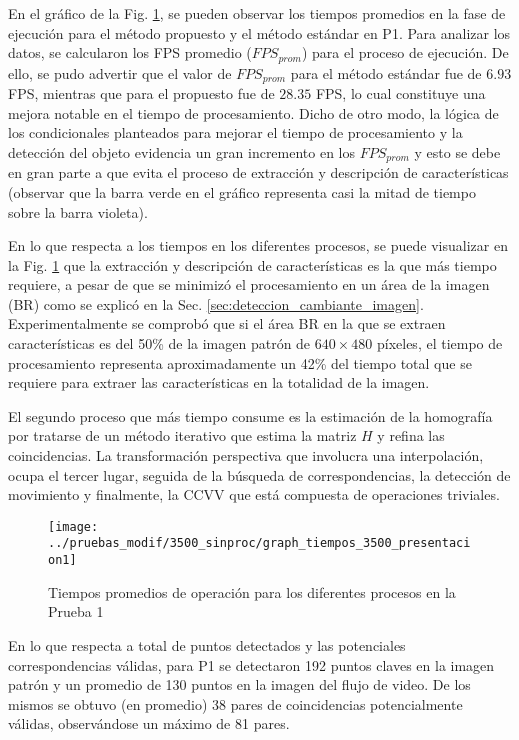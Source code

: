 En el gráfico de la Fig. \ref{graph:graph_tiempos_3500}, se pueden observar los tiempos promedios en la fase de ejecución para el método propuesto y el método estándar en P1. %
Para analizar los datos, se calcularon los FPS promedio ($FPS_{prom}$) para el proceso de ejecución. De ello, se pudo advertir que el valor de $FPS_{prom}$ para el método estándar fue de $6.93$ FPS, mientras que para el propuesto fue de $28.35$ FPS, lo cual constituye una mejora notable en el tiempo de procesamiento. Dicho de otro modo, la lógica de los condicionales planteados para mejorar el tiempo de procesamiento y la detección del objeto evidencia un gran incremento en los $FPS_{prom}$ y esto se debe en gran parte a que evita el proceso de extracción y descripción de características (observar que la barra verde en el gráfico representa casi la mitad de tiempo sobre la barra violeta).

En lo que respecta a los tiempos en los diferentes procesos, se puede visualizar en la Fig. \ref{graph:graph_tiempos_3500} que la extracción y descripción de características es la que más tiempo requiere, a pesar de que se minimizó el procesamiento en un área de la imagen (BR) como se explicó en la Sec. \ref{sec:deteccion_cambiante_imagen}. Experimentalmente se comprobó que si el área BR en la que se extraen características es del 50\% de la imagen patrón de $640 \times 480$ píxeles, el tiempo de procesamiento representa aproximadamente un 42\% del tiempo total que se requiere para extraer las características en la totalidad de la imagen.

El segundo proceso que más tiempo consume es la estimación de la homografía por tratarse de un método iterativo que estima la matriz $H$ y refina las coincidencias. La transformación perspectiva que involucra una interpolación, ocupa el tercer lugar, seguida de la búsqueda de correspondencias, la detección de movimiento y finalmente, la CCVV que está compuesta de operaciones triviales.
\begin{figure}[tbhp]
   \centering
        \texttt{[image: ../pruebas\_modif/3500\_sinproc/graph\_tiempos\_3500\_presentacion1]}
    \caption[Tiempos promedios de operación para los diferentes procesos en la Prueba 1]{Tiempos promedios de operación para los diferentes procesos en la Prueba 1}
   \label{graph:graph_tiempos_3500}
\end{figure}

En lo que respecta a total de puntos detectados y las potenciales correspondencias válidas, para P1 se detectaron 192 puntos claves en la imagen patrón y un promedio de 130 puntos en la imagen del flujo de video. De los mismos se obtuvo (en promedio) 38 pares de coincidencias potencialmente válidas, observándose un máximo de 81 pares.

